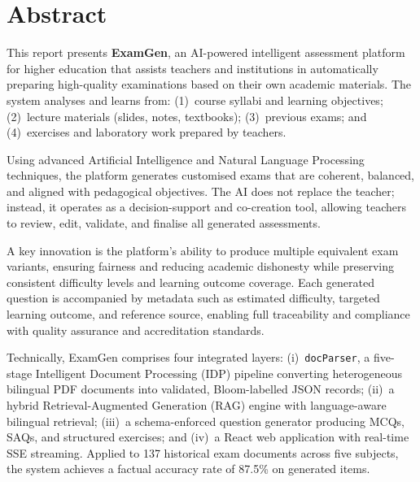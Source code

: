 \documentclass[12pt,a4paper]{article}
\begin{document}


\newpage

\thispagestyle{empty}
\section*{Abstract}

This report presents \textbf{ExamGen}, an AI-powered intelligent assessment platform
for higher education that assists teachers and institutions in automatically preparing
high-quality examinations based on their own academic materials.
The system analyses and learns from: (1)~course syllabi and learning objectives;
(2)~lecture materials (slides, notes, textbooks); (3)~previous exams;
and (4)~exercises and laboratory work prepared by teachers.

Using advanced Artificial Intelligence and Natural Language Processing techniques,
the platform generates customised exams that are coherent, balanced, and aligned
with pedagogical objectives. The AI does not replace the teacher; instead, it
operates as a decision-support and co-creation tool, allowing teachers to review,
edit, validate, and finalise all generated assessments.

A key innovation is the platform's ability to produce multiple equivalent exam
variants, ensuring fairness and reducing academic dishonesty while preserving
consistent difficulty levels and learning outcome coverage.
Each generated question is accompanied by metadata such as estimated difficulty,
targeted learning outcome, and reference source, enabling full traceability and
compliance with quality assurance and accreditation standards.

Technically, ExamGen comprises four integrated layers: (i)~\texttt{docParser},
a five-stage Intelligent Document Processing (IDP) pipeline converting heterogeneous
bilingual PDF documents into validated, Bloom-labelled JSON records; (ii)~a hybrid
Retrieval-Augmented Generation (RAG) engine with language-aware bilingual retrieval;
(iii)~a schema-enforced question generator producing MCQs, SAQs, and structured
exercises; and (iv)~a React web application with real-time SSE streaming.
Applied to 137 historical exam documents across five subjects, the system achieves
a factual accuracy rate of 87.5\% on generated items.
\end{document}
